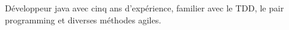 
\begin{cvparagraph}

Développeur java avec cinq ans d'expérience, familier avec le TDD, le pair programming et diverses méthodes agiles.

\end{cvparagraph}
